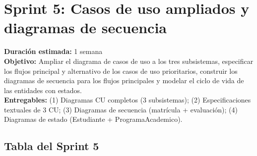\section*{Sprint 5: Casos de uso ampliados y diagramas de secuencia}
\label{sprint:5}

\begin{tcolorbox}[sprintBox, title={Sprint 5 — Casos de uso ampliados y
  diagramas de secuencia}]
  \textbf{Duración estimada:} 1 semana\\
  \textbf{Objetivo:} Ampliar el diagrama de casos de uso a los tres
  subsistemas, especificar los flujos principal y alternativo de los
  casos de uso prioritarios, construir los diagramas de secuencia para
  los flujos principales y modelar el ciclo de vida de las entidades
  con estados.\\
  \textbf{Entregables:} (1) Diagramas CU completos (3 subsistemas);
  (2) Especificaciones textuales de 3 CU; (3) Diagramas de secuencia
  (matrícula + evaluación); (4) Diagramas de estado (Estudiante +
  ProgramaAcademico).
\end{tcolorbox}

\bigskip

\subsection*{Tabla del Sprint 5}

